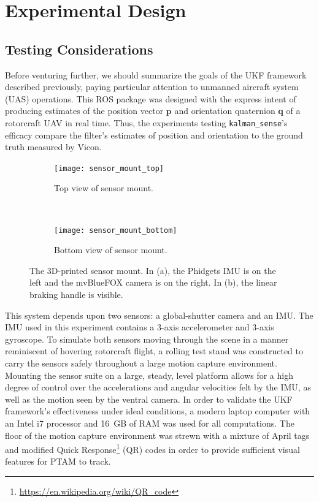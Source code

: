 \chapter{Experimental Design} \label{ch:Exp_Design}

\section{Testing Considerations}

Before venturing further, we should summarize the goals of the UKF framework described previously, paying particular attention to unmanned aircraft system (UAS) operations. This ROS package was designed with the express intent of producing estimates of the position vector $\mathbf{p}$ and orientation quaternion $\mathbf{q}$ of a rotorcraft UAV in real time. Thus, the experiments testing \texttt{kalman\_sense}'s efficacy compare the filter's estimates of position and orientation to the ground truth measured by Vicon.

\begin{figure}[t]
    \centering
    \begin{subfigure}[t]{0.5\textwidth}
        \centering
        \texttt{[image: sensor\_mount\_top]}
        \caption{Top view of sensor mount.}
    \end{subfigure}%
    ~ 
    \begin{subfigure}[t]{0.5\textwidth}
        \centering
        \texttt{[image: sensor\_mount\_bottom]}
        \caption{Bottom view of sensor mount.}
    \end{subfigure}
    \caption[3D-printed sensor mount]{The 3D-printed sensor mount. In (a), the Phidgets IMU is on the left and the mvBlueFOX camera is on the right. In (b), the linear braking handle is visible.}
    \label{fig:sensor_mount}
\end{figure}

This system depends upon two sensors: a global-shutter camera and an IMU. The IMU used in this experiment contains a 3-axis accelerometer and 3-axis gyroscope. To simulate both sensors moving through the scene in a manner reminiscent of hovering rotorcraft flight, a rolling test stand was constructed to carry the sensors safely throughout a large motion capture environment. Mounting the sensor suite on a large, steady, level platform allows for a high degree of control over the accelerations and angular velocities felt by the IMU, as well as the motion seen by the ventral camera. In order to validate the UKF framework's effectiveness under ideal conditions, a modern laptop computer with an Intel i7 processor and 16~GB of RAM was used for all computations. The floor of the motion capture environment was strewn with a mixture of April tags and modified Quick Response\footnote{\url{https://en.wikipedia.org/wiki/QR_code}} (QR) codes in order to provide sufficient visual features for PTAM to track.

